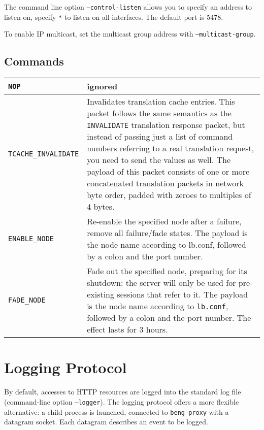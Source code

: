 \documentclass[a4paper,12pt]{article}
\begin{document}
The command line option \texttt{--control-listen} allows you to
specify an address to listen on, specify \texttt{*} to listen on all
interfaces.  The default port is 5478.

To enable IP multicast, set the multicast group address with
\texttt{--multicast-group}.

\subsection{Commands}

\begin{longtable}{|l|p{8cm}|}
\hline

\texttt{NOP} & ignored \\

\hline

\verb|TCACHE_INVALIDATE| & Invalidates translation cache entries.
This packet follows the same semantics as the \verb|INVALIDATE|
translation response packet, but instead of passing just a list of
command numbers referring to a real translation request, you need to
send the values as well.  The payload of this packet consists of one
or more concatenated translation packets in network byte order, padded
with zeroes to multiples of 4 bytes.  \\

\hline

\verb|ENABLE_NODE| & Re-enable the specified node after a failure,
remove all failure/fade states.  The payload is the node name
according to lb.conf, followed by a colon and the port number. \\

\hline

\verb|FADE_NODE| & Fade out the specified node, preparing for its
shutdown: the server will only be used for pre-existing sessions that
refer to it.  The payload is the node name according to
\texttt{lb.conf}, followed by a colon and the port number.  The effect
lasts for 3 hours. \\

\hline
\end{longtable}


\section{Logging Protocol}

By default, accesses to HTTP resources are logged into the standard
log file (command-line option \texttt{--logger}).  The logging
protocol offers a more flexible alternative: a child process is
launched, connected to \texttt{beng-proxy} with a datagram socket.
Each datagram describes an event to be logged.
\end{document}

